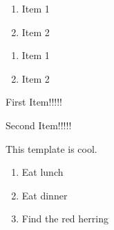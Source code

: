 

\begin{enumerate}
\item Item 1
\item Item 2
\end{enumerate}


\begin{enumerate}
\item Item 1
\item Item 2
\end{enumerate}


First Item!!!!!


Second Item!!!!!


This template is cool.


\begin{enumerate}
\item Eat lunch
\item Eat dinner
\item Find the red herring
\end{enumerate}


